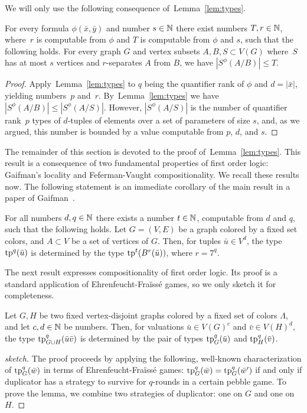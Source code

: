 We will only use the following consequence of~Lemma~\ref{lem:types}.

\begin{corollary}\label{cor:bound}
For every formula $\phi(\bar x,\bar y)$ 
and number $s\in \mathbb{N}$
there exist numbers $T,r\in \mathbb{N}$,
where~$r$ is computable from $\phi$ and $T$ is computable from $\phi$ and $s$,
  such that the following holds. For every graph $G$ and vertex subsets $A,B,S\subset V(G)$ 
  where~$S$ has at most $s$ vertices and $r$-separates $A$ from $B$, we have $|S^\phi(A/B)|\le T$.
\end{corollary}
\begin{proof}
Apply~Lemma~\ref{lem:types} to $q$ being the quantifier rank of $\phi$ and $d=|\bar x|$, yielding numbers~$p$ and~$r$.
By~Lemma~\ref{lem:types} we have $|S^\phi(A/B)|\leq |S^\phi(A/S)|$.
However, $|S^\phi(A/S)|$ is the number of quantifier rank~$p$ types of $d$-tuples of elements over a set of parameters of size $s$, and, as we argued, this number is bounded by a value computable from $p$, $d$, and $s$.
\end{proof}

The remainder of this section is devoted to the proof of~Lemma~\ref{lem:types}.
This result is a consequence of two fundamental properties of first order logic:
Gaifman's locality and Feferman-Vaught compositionality. We recall these results now.
The following statement is an immediate corollary of the main result in a paper of Gaifman~\cite{gaifman1982local}.

\begin{lemma}\label{lem:gaif}
  For all numbers $d,q\in \mathbb{N}$ there exists a number $t\in \mathbb{N}$, computable from $d$ and $q$, such that the following holds.
  Let $G=(V,E)$ be a graph colored by a fixed set colors, and $A\subset V$ be a set of vertices of $G$.
  Then, for tuples $\bar u\in V^d$, the type  $\mathrm{tp}^q(\bar u)$ is determined by the type $\mathrm{tp}^{t}(B^r(\bar u))$, where $r=7^q$.
\end{lemma}

The next result expresses compositionality of first order logic. Its proof is a standard application of Ehrenfeucht-Fra\"iss\'e games, so we only sketch it for completeness.

\begin{lemma}\label{lem:fv}
  Let $G,H$ be two fixed vertex-disjoint graphs colored by a fixed set of colors $\Lambda$, and let 
  $c,d\in\mathbb{N}$  be numbers.
  Then, for valuations $\bar u\in V(G)^{c}$ and $\bar v\in V(H)^{d}$, 
 the type 
 $\mathrm{tp}^q_{G\cup H}(\bar u\bar v)$
 is determined by the pair of types $\mathrm{tp}^q_G(\bar u)$ and $\mathrm{tp}^q_H(\bar v)$.
\end{lemma}
\begin{proof}[sketch]The proof proceeds by applying the following, well-known characterization of $\mathrm{tp}^q_G(\bar w)$ in terms of Ehrenfeucht-Fra\"iss\'e games:
$\mathrm{tp}^q_{G}(\bar w)=\mathrm{tp}^q_{G}(\bar w')$
if and only if duplicator has a strategy to survive for $q$-rounds in a certain pebble game.
To prove the lemma, we combine two strategies of duplicator: one on $G$ and one on $H$.
\end{proof}

